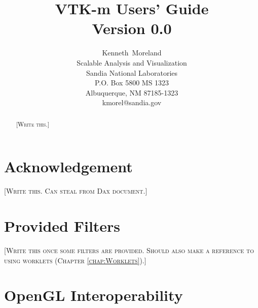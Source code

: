 \documentclass[12pt,report]{SANDreport}
\title{VTK-m Users' Guide \\
  \relsize{-2}Version 0.0
}
\author{Kenneth~Moreland \\
  \relsize{-2} Scalable Analysis and Visualization \\[-1ex]
  \relsize{-2} Sandia National Laboratories \\[-1ex]
  \relsize{-2} P.O. Box 5800 MS 1323 \\[-1ex]
  \relsize{-2} Albuquerque, NM 87185-1323 \\[-1ex]
  \relsize{-2} kmorel@sandia.gov
}
\date{} %
\newcommand{\fix}[1]{{\color{red}\textsc{[#1]}}}
\begin{document}
\sloppy

\maketitle

\begin{abstract}
  \fix{Write this.}
\end{abstract}

\clearpage

\chapter*{Acknowledgement}

\fix{Write this. Can steal from Dax document.}


\cleardoublepage %
\tableofcontents
\listoffigures
\lstlistoflistings

\clearpage

\SANDmain





\chapter{Provided Filters}
\label{chap:ProvidedFilters}

\fix{Write this once some filters are provided. Should also make a
  reference to using worklets (Chapter \ref{chap:Worklets}).}









\chapter{OpenGL Interoperability}
\label{chap:OpenGLInteroperability}




\begin{flushleft}
  \clearpage
  \lhead[]{}
  \rhead[]{}
  \printindex
\end{flushleft}


\end{document}
